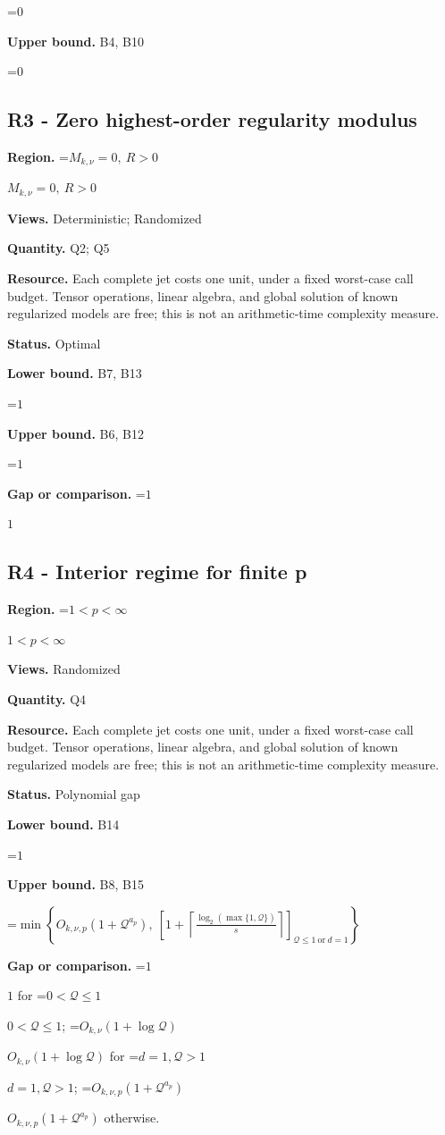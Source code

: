\documentclass[10pt,a4paper]{article}
\newcommand{\AtlasMath}[1]{\par\begingroup\centering\setbox0=\hbox{$\displaystyle #1$}\ifdim\wd0>1.4\linewidth\typeout{ATLAS WIDE FORMULA: \the\wd0}\fi\ifdim\wd0>\linewidth\resizebox{\linewidth}{!}{\box0}\else\box0\fi\par\endgroup}
\newcommand{\AtlasInlineMath}[1]{\begingroup\setbox0=\hbox{$#1$}\ifdim\wd0>.4\linewidth\endgroup\AtlasMath{#1}\else\endgroup$#1$\fi}
\begin{document}
\AtlasMath{0}
\textbf{Upper bound.} B4, B10

\AtlasMath{0}
\subsection{R3 - Zero highest-order regularity modulus}
\textbf{Region.} \AtlasInlineMath{M_{k,\nu}=0,\ R>0}

\textbf{Views.} Deterministic; Randomized

\textbf{Quantity.} Q2; Q5

\textbf{Resource.} Each complete jet costs one unit, under a fixed worst-case call budget. Tensor operations, linear algebra, and global solution of known regularized models are free; this is not an arithmetic-time complexity measure.

\textbf{Status.} Optimal

\textbf{Lower bound.} B7, B13

\AtlasMath{1}
\textbf{Upper bound.} B6, B12

\AtlasMath{1}
\textbf{Gap or comparison.} \AtlasInlineMath{1}

\subsection{R4 - Interior regime for finite p}
\textbf{Region.} \AtlasInlineMath{1<p<\infty}

\textbf{Views.} Randomized

\textbf{Quantity.} Q4

\textbf{Resource.} Each complete jet costs one unit, under a fixed worst-case call budget. Tensor operations, linear algebra, and global solution of known regularized models are free; this is not an arithmetic-time complexity measure.

\textbf{Status.} Polynomial gap

\textbf{Lower bound.} B14

\AtlasMath{1}
\textbf{Upper bound.} B8, B15

\AtlasMath{\min\!\left\{O_{k,\nu,p}(1+\mathcal{Q}^{a_p}),\ \left[1+\left\lceil\frac{\log_2(\max\{1,\mathcal{Q}\})}{s}\right\rceil\right]_{\mathcal{Q}\le1\ \mathrm{or}\ d=1}\right\}}
\textbf{Gap or comparison.} \AtlasInlineMath{1} for \AtlasInlineMath{0<\mathcal{Q}\le1}; \AtlasInlineMath{O_{k,\nu}(1+\log\mathcal{Q})} for \AtlasInlineMath{d=1,\mathcal{Q}>1}; \AtlasInlineMath{O_{k,\nu,p}(1+\mathcal{Q}^{a_p})} otherwise.
\end{document}
